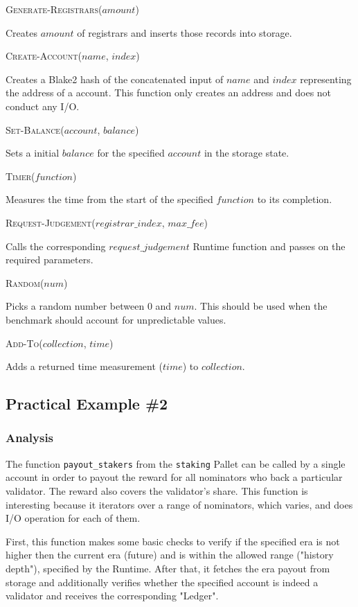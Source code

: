 \documentclass[11pt,a4paper]{article}
\newcommand{\SubItem}[1]{
    {\setlength\itemindent{15pt} \item[-] #1}
}
\begin{document}
\begin{itemize}
  \item \textsc{Generate-Registrars($amount$)}
  \SubItem{Creates $amount$ of registrars and inserts those records into storage.}
  \item \textsc{Create-Account($name$, $index$)} \SubItem{Creates a Blake2 hash
      of the concatenated input of $name$ and $index$ representing the address
      of a account. This function only creates an address and does not conduct
      any I/O.}
  \item \textsc{Set-Balance($account$, $balance$)}
  \SubItem{Sets a initial $balance$ for the specified $account$ in the storage state.}
  \item \textsc{Timer($function$)}
  \SubItem{Measures the time from the start of the specified $function$ to its completion.}
  \item \textsc{Request-Judgement($registrar\_index$, $max\_fee$)}
  \SubItem{Calls the corresponding $request\_judgement$ Runtime function and passes on
  the required parameters.}
  \item \textsc{Random($num$)}
  \SubItem{Picks a random number between 0 and $num$. This should be used when the benchmark
  should account for unpredictable values.}
  \item \textsc{Add-To($collection$, $time$)}
  \SubItem{Adds a returned time measurement ($time$) to $collection$.}
\end{itemize}

\subsection{Practical Example \#2}

\subsubsection{Analysis}

The function \verb|payout_stakers| from the \verb|staking| Pallet can be called
by a single account in order to payout the reward for all nominators who back a
particular validator. The reward also covers the validator's share. This
function is interesting because it iterators over a range of nominators, which
varies, and does I/O operation for each of them.
\newline

First, this function makes some basic checks to verify if the specified era is
not higher then the current era (future) and is within the allowed range
("history depth"), specified by the Runtime. After that, it fetches the era
payout from storage and additionally verifies whether the specified account is
indeed a validator and receives the corresponding "Ledger".
\end{document}
